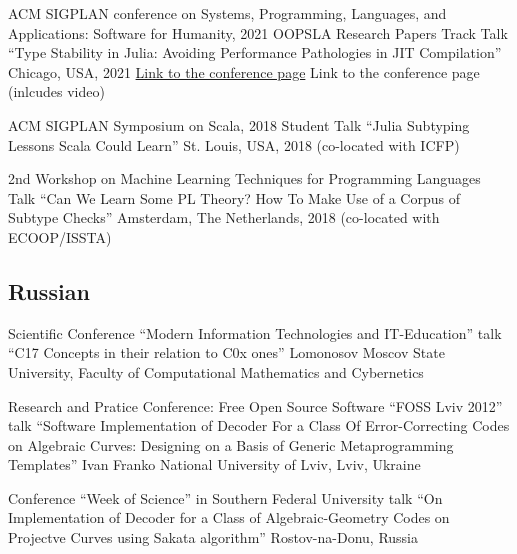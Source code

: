 \documentclass[11pt,a4paper]{moderncv}   %
\newcommand{\CPP}
{C\nolinebreak[4]\hspace{-.05em}\raisebox{.35ex}{\scriptsize\bfseries +\hspace{-.05em}+}}
\newcommand{\MyHrefImpl}[2]{%
\textcolor{blue}{\href{#1}{#2}}}
\def\LINKS{}
\newcommand*{\myhref}[2]{%
\ignorespaces%
\ifdefined\LINKS%
\MyHrefImpl{#1}{#2}%
\else%
#2%
\fi%
}
\begin{document}
%
    {ACM SIGPLAN conference on Systems, Programming, Languages, and Applications: Software for Humanity, 2021}%
    {OOPSLA Research Papers Track Talk ``Type Stability in Julia: Avoiding Performance Pathologies in JIT Compilation''}
    {Chicago, USA, 2021}{}%
    {%
	    \myhref{https://2021.splashcon.org/details/splash-2021-oopsla/54/Type-Stability-in-Julia-Avoiding-Performance-Pathologies-in-JIT-Compilation}{Link to the conference page} (inlcudes video)%
    }

%
    {ACM SIGPLAN Symposium on Scala, 2018}%
    {Student Talk ``Julia Subtyping Lessons Scala Could Learn''}
    {St. Louis, USA, 2018 (co-located with ICFP)}{}%
    {%
    }


%
    {2nd Workshop on Machine Learning Techniques for Programming Languages}%
    {Talk ``Can We Learn Some PL Theory? How To Make Use of a Corpus of Subtype Checks''}
    {Amsterdam, The Netherlands, 2018 (co-located with ECOOP/ISSTA)}{}%
    {%
    }

{\footnotesize
\subsection{Russian}

%
    {Scientific Conference “Modern Information Technologies and IT-Education”}%
    {talk “\protect\CPP{}17 Concepts in their relation to \protect\CPP{}0x ones”}
    {Lomonosov Moscov State University, Faculty of Computational Mathematics and Cybernetics}{}%
    {%
    }

%
    {Research and Pratice Conference: Free Open Source Software “FOSS Lviv 2012”}%
    {talk “Software Implementation of Decoder For a Class Of Error-Correcting Codes on Algebraic Curves: Designing on a Basis of Generic Metaprogramming Templates”}%
    {Ivan Franko National University of Lviv, Lviv, Ukraine}{}%
    {%
    }

%
    {Conference “Week of Science” in Southern Federal University}%
    {talk “On Implementation of Decoder for a Class of Algebraic-Geometry Codes on Projectve Curves using Sakata algorithm”}%
    {Rostov-na-Donu, Russia}{}%
    {%
    }
}
\end{document}
